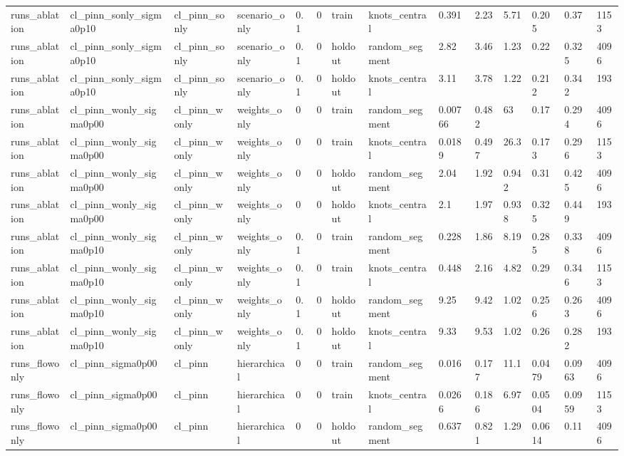 \begin{table}[t]
\begin{tabular}{llllllllllllll}
runs\_ablation & cl\_pinn\_sonly\_sigma0p10 & cl\_pinn\_sonly & scenario\_only & 0.1 & 0 & train & knots\_central & 0.391 & 2.23 & 5.71 & 0.205 & 0.37 & 1153 \\
runs\_ablation & cl\_pinn\_sonly\_sigma0p10 & cl\_pinn\_sonly & scenario\_only & 0.1 & 0 & holdout & random\_segment & 2.82 & 3.46 & 1.23 & 0.22 & 0.325 & 4096 \\
runs\_ablation & cl\_pinn\_sonly\_sigma0p10 & cl\_pinn\_sonly & scenario\_only & 0.1 & 0 & holdout & knots\_central & 3.11 & 3.78 & 1.22 & 0.212 & 0.342 & 193 \\
runs\_ablation & cl\_pinn\_wonly\_sigma0p00 & cl\_pinn\_wonly & weights\_only & 0 & 0 & train & random\_segment & 0.00766 & 0.482 & 63 & 0.17 & 0.294 & 4096 \\
runs\_ablation & cl\_pinn\_wonly\_sigma0p00 & cl\_pinn\_wonly & weights\_only & 0 & 0 & train & knots\_central & 0.0189 & 0.497 & 26.3 & 0.173 & 0.296 & 1153 \\
runs\_ablation & cl\_pinn\_wonly\_sigma0p00 & cl\_pinn\_wonly & weights\_only & 0 & 0 & holdout & random\_segment & 2.04 & 1.92 & 0.942 & 0.31 & 0.425 & 4096 \\
runs\_ablation & cl\_pinn\_wonly\_sigma0p00 & cl\_pinn\_wonly & weights\_only & 0 & 0 & holdout & knots\_central & 2.1 & 1.97 & 0.938 & 0.325 & 0.449 & 193 \\
runs\_ablation & cl\_pinn\_wonly\_sigma0p10 & cl\_pinn\_wonly & weights\_only & 0.1 & 0 & train & random\_segment & 0.228 & 1.86 & 8.19 & 0.285 & 0.338 & 4096 \\
runs\_ablation & cl\_pinn\_wonly\_sigma0p10 & cl\_pinn\_wonly & weights\_only & 0.1 & 0 & train & knots\_central & 0.448 & 2.16 & 4.82 & 0.29 & 0.346 & 1153 \\
runs\_ablation & cl\_pinn\_wonly\_sigma0p10 & cl\_pinn\_wonly & weights\_only & 0.1 & 0 & holdout & random\_segment & 9.25 & 9.42 & 1.02 & 0.256 & 0.263 & 4096 \\
runs\_ablation & cl\_pinn\_wonly\_sigma0p10 & cl\_pinn\_wonly & weights\_only & 0.1 & 0 & holdout & knots\_central & 9.33 & 9.53 & 1.02 & 0.26 & 0.282 & 193 \\
runs\_flowonly & cl\_pinn\_sigma0p00 & cl\_pinn & hierarchical & 0 & 0 & train & random\_segment & 0.016 & 0.177 & 11.1 & 0.0479 & 0.0963 & 4096 \\
runs\_flowonly & cl\_pinn\_sigma0p00 & cl\_pinn & hierarchical & 0 & 0 & train & knots\_central & 0.0266 & 0.186 & 6.97 & 0.0504 & 0.0959 & 1153 \\
runs\_flowonly & cl\_pinn\_sigma0p00 & cl\_pinn & hierarchical & 0 & 0 & holdout & random\_segment & 0.637 & 0.821 & 1.29 & 0.0614 & 0.11 & 4096 \\

\end{tabular}
\end{table}
